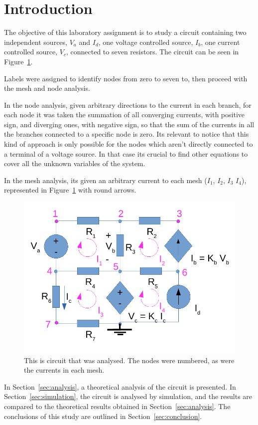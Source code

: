 \section{Introduction}
\label{sec:introduction}

The objective of this laboratory assignment is to study a circuit containing two independent sources, $V_a$ and $I_d$, one voltage controlled source, $I_b$, one current controlled source, $V_c$, connected to seven resistors. The circuit can be seen in Figure~\ref{fig1}.

Labels were assigned to identify nodes from zero to seven to, then proceed with the mesh and node analysis.

In the node analysis, given arbitrary directions to the current in each branch, for each node it was taken the summation of all converging currents, with positive sign, and diverging ones, with negative sign, so that the sum of the currents in all the branches connected to a specific node is zero. Its relevant to notice that this kind of approach is only possible for the nodes which aren't directly connected to a terminal of a voltage source. In that case its crucial to find other equations to cover all the unknown variables of the system.

In the mesh analysis, its given an arbitrary current to each mesh ($I_1$, $I_2$, $I_3$ $I_4$), represented in Figure~\ref{fig1} with round arrows. 



\begin{figure}[h] \centering
\includegraphics[width=0.4\linewidth]{t1-1.pdf}
\caption{This is circuit that was analysed. The nodes were numbered, as were the currents in each mesh.}
\label{fig1}
\end{figure}

In Section~\ref{sec:analysis}, a theoretical analysis of the circuit is
presented. In Section~\ref{sec:simulation}, the circuit is analysed by
simulation, and the results are compared to the theoretical results obtained in
Section~\ref{sec:analysis}. The conclusions of this study are outlined in
Section~\ref{sec:conclusion}.

